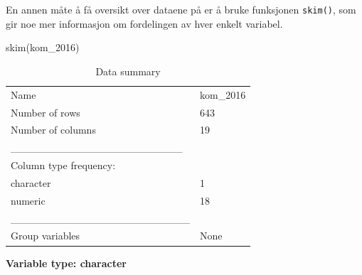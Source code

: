 \documentclass[
  letterpaper,
  DIV=11,
  numbers=noendperiod]{scrreprt}
\newenvironment{Shaded}{\begin{snugshade}}{\end{snugshade}}
\newcommand{\FunctionTok}[1]{\textcolor[rgb]{0.28,0.35,0.67}{#1}}
\newcommand{\NormalTok}[1]{\textcolor[rgb]{0.00,0.23,0.31}{#1}}
\theoremstyle{definition}
\theoremstyle{remark}
\begin{document}
En annen måte å få oversikt over dataene på er å bruke funksjonen
\texttt{skim()}, som gir noe mer informasjon om fordelingen av hver
enkelt variabel.

\begin{Shaded}
\begin{Highlighting}[]
\FunctionTok{skim}\NormalTok{(kom\_2016)}
\end{Highlighting}
\end{Shaded}

\begin{longtable}[]{@{}ll@{}}
\caption{Data summary}\tabularnewline
\toprule()
\endhead
Name & kom\_2016 \\
Number of rows & 643 \\
Number of columns & 19 \\
\_\_\_\_\_\_\_\_\_\_\_\_\_\_\_\_\_\_\_\_\_\_\_ & \\
Column type frequency: & \\
character & 1 \\
numeric & 18 \\
\_\_\_\_\_\_\_\_\_\_\_\_\_\_\_\_\_\_\_\_\_\_\_\_ & \\
Group variables & None \\
\bottomrule()
\end{longtable}

\textbf{Variable type: character}
\end{document}
